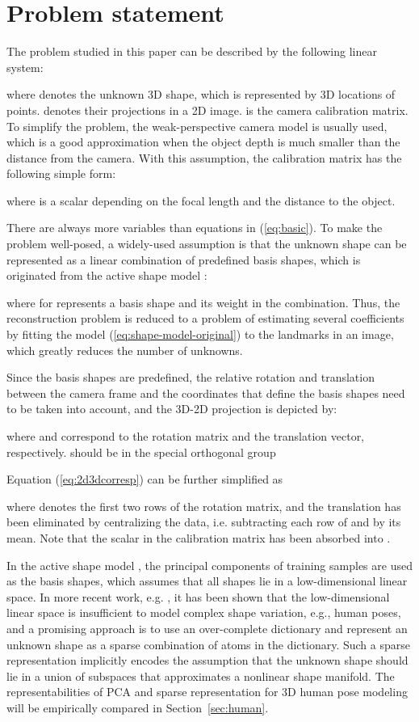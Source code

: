 \documentclass[10pt,journal,cspaper,compsoc]{IEEEtran}
\newcommand{\refEq}[1]{(\ref{#1})}
\newcommand{\refSec}[1]{Section~\ref{#1}}
\begin{document}
\section{Problem statement}\label{sec:formulation}

The problem studied in this paper can be described by the following linear system:

where  denotes the unknown 3D shape, which is represented by 3D locations of  points.  denotes their projections in a 2D image.  is the camera calibration matrix. To simplify the problem, the weak-perspective camera model is usually used, which is a good approximation when the object depth is much smaller than the distance from the camera. With this assumption, the calibration matrix has the following simple form:

where  is a scalar depending on the focal length and the distance to the object.

There are always more variables than equations in \refEq{eq:basic}. To make the problem well-posed, a widely-used assumption is that the unknown shape can be represented as a linear combination of predefined basis shapes, which is originated from the active shape model \cite{cootes1995active}:

where  for  represents a basis shape and  its weight in the combination. Thus, the reconstruction problem is reduced to a problem of estimating several coefficients by fitting the model \refEq{eq:shape-model-original} to the landmarks in an image, which greatly reduces the number of unknowns.

Since the basis shapes are predefined, the relative rotation and translation between the camera frame and the coordinates that define the basis shapes need to be taken into account, and the 3D-2D projection is depicted by:

where  and  correspond to the rotation matrix and the translation vector, respectively.  should be in the special orthogonal group


Equation \refEq{eq:2d3dcorresp} can be further simplified as

where  denotes the first two rows of the rotation matrix, and the translation  has been eliminated by centralizing the data, i.e. subtracting each row of  and  by its mean. Note that the scalar  in the calibration matrix has been absorbed into .

In the active shape model \cite{cootes1995active}, the principal components of training samples are used as the basis shapes, which assumes that all shapes lie in a low-dimensional linear space. In more recent work, e.g. \cite{ramakrishna2012reconstructing,zhang2011sparse,zhu2010model,zhu2014complex}, it has been shown that the low-dimensional linear space is insufficient to model complex shape variation, e.g., human poses, and a promising approach is to use an over-complete dictionary and represent an unknown shape as a sparse combination of atoms in the dictionary. Such a sparse representation implicitly encodes the assumption that the unknown shape should lie in a union of subspaces that approximates a nonlinear shape manifold. The representabilities of PCA and sparse representation for 3D human pose modeling will be empirically compared in \refSec{sec:human}.
\end{document}
